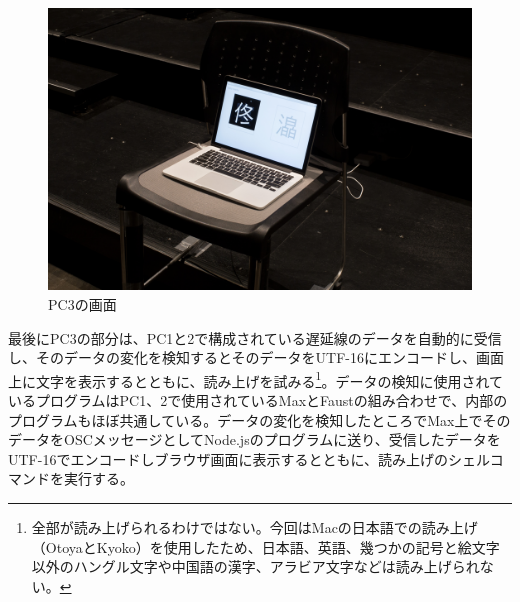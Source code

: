 \documentclass[a4paper,report]{jsbook}
\begin{document}
\begin{no-prefix-figure-caption}

\begin{figure}[htbp]
\centering
\includegraphics[width=1.00000\textwidth]{./img/adm2_archive5.jpg}
\caption{PC3の画面}
\end{figure}

\end{no-prefix-figure-caption}

最後にPC3の部分は、PC1と2で構成されている遅延線のデータを自動的に受信し、そのデータの変化を検知するとそのデータをUTF-16にエンコードし、画面上に文字を表示するとともに、読み上げを試みる\footnote{全部が読み上げられるわけではない。今回はMacの日本語での読み上げ（OtoyaとKyoko）を使用したため、日本語、英語、幾つかの記号と絵文字以外のハングル文字や中国語の漢字、アラビア文字などは読み上げられない。}。データの検知に使用されているプログラムはPC1、2で使用されているMaxとFaustの組み合わせで、内部のプログラムもほぼ共通している。データの変化を検知したところでMax上でそのデータをOSCメッセージとしてNode.jsのプログラムに送り、受信したデータをUTF-16でエンコードしブラウザ画面に表示するとともに、読み上げのシェルコマンドを実行する。
\end{document}

